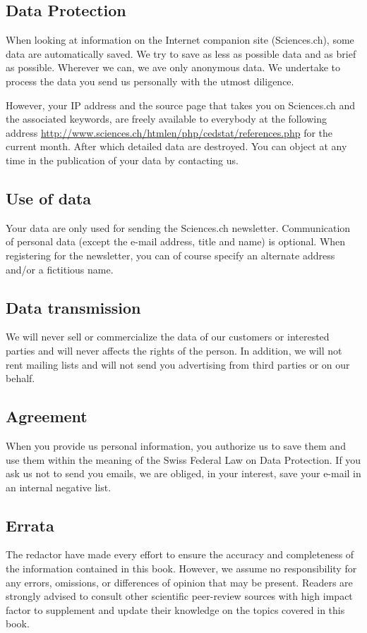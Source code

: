 	\pagebreak
	\subsection{Data Protection}
	When looking at information on the Internet companion site (Sciences.ch), some data are automatically saved. We try to save as less as possible data and as brief as possible. Wherever we can, we ave only anonymous data. We undertake to process the data you send us personally with the utmost diligence.

	However, your IP address and the source page that takes you on Sciences.ch and the associated keywords, are freely available to everybody at the following address \url{http://www.sciences.ch/htmlen/php/cedstat/references.php} for the current month. After which detailed data are destroyed. You can object at any time in the publication of your data by contacting us.

	\subsection{Use of data}

	Your data are only used for sending the Sciences.ch newsletter. Communication of personal data (except the e-mail address, title and name) is optional. When registering for the newsletter, you can of course specify an alternate address and/or a fictitious name.

	\subsection{Data transmission}

	We will never sell or commercialize the data of our customers or interested parties and will never affects the rights of the person. In addition, we will not rent mailing lists and will not send you advertising from third parties or on our behalf.

	\subsection{Agreement}

	When you provide us personal information, you authorize us to save them and use them within the meaning of the Swiss Federal Law on Data Protection. If you ask us not to send you emails, we are obliged, in your interest, save your e-mail in an internal negative list.
	
	\subsection{Errata}
	The redactor have made every effort to ensure the accuracy and completeness of the information contained in this book. However, we assume no responsibility for any errors, omissions, or differences of opinion that may be present. Readers are strongly advised to consult other scientific peer-review sources with high impact factor to supplement and update their knowledge on the topics covered in this book.

